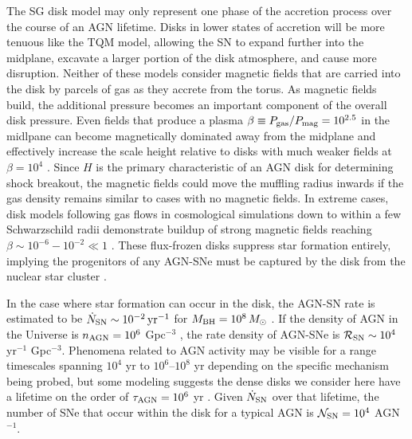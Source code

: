 The SG disk model may only represent one phase of the accretion process over the course of an AGN lifetime.
Disks in lower states of accretion will be more tenuous like the TQM model, allowing the SN to expand further into the midplane, excavate a larger portion of the disk atmosphere, and cause more disruption.
Neither of these models consider magnetic fields that are carried into the disk by parcels of gas as they accrete from the torus.
As magnetic fields build, the additional pressure becomes an important component of the overall disk pressure.
Even fields that produce a plasma $\beta \equiv P_{\rm gas} / P_{\rm mag} = 10^{2.5}$ in the midlpane can become magnetically dominated away from the midplane and effectively increase the scale height relative to disks with much weaker fields at $\beta=10^4$ \citep{Gerling-Dunsmore+25}.
Since $H$ is the primary characteristic of an AGN disk for determining shock breakout, the magnetic fields could move the muffling radius inwards if the gas density remains similar to cases with no magnetic fields.
In extreme cases, disk models following gas flows in cosmological simulations down to within a few Schwarzschild radii demonstrate buildup of strong magnetic fields reaching $\beta \sim 10^{-6} - 10^{-2} \ll 1$ \citep{Hopkins+25}.
These flux-frozen disks suppress star formation entirely, implying the progenitors of any AGN-SNe must be captured by the disk from the nuclear star cluster \citep{Fabj+20,Nasim+22}.

In the case where star formation can occur in the disk, the AGN-SN rate is estimated to be $\dot{N}_{\rm SN}\sim10^{-2}\,{\rm yr}^{-1}$ for $M_{\rm BH}=10^8\,M_{\odot}$ \citep{HuangLinShields23}.
If the density of AGN in the Universe is $n_{\rm AGN}=10^6$ Gpc$^{-3}$ \citep{OsterbrockFerland06}, the rate density of AGN-SNe is $\mathcal{R_{\rm SN}} \sim 10^4$ yr$^{-1}$ Gpc$^{-3}$.
Phenomena related to AGN activity may be visible for a range timescales spanning $10^4$ yr \citep{Morganti17} to $10^6$--$10^8$ yr \citep{Biava+21} depending on the specific mechanism being probed, but some modeling suggests the dense disks we consider here have a lifetime on the order of $\tau_{\rm AGN}=10^6$ yr \citep{Angles-Alcazar+21}.
Given $\dot{N}_{\rm SN}$ over that lifetime, the number of SNe that occur within the disk for a typical AGN is $\mathcal{N}_{\rm SN}=10^4$ AGN$^{-1}$.

